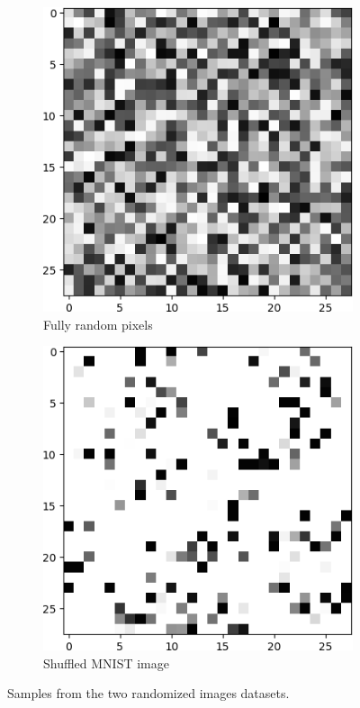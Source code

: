 \documentclass[12pt,oneside]{CUNY_PhD}
\begin{document}
\begin{figure}[!h]
    \centering
    \begin{subfigure}[t]{0.49\textwidth}
        \includegraphics[width=\textwidth]{images/mnist-behavior/MNIST-Sample-random-noise-fixed.png}
        \caption*{Fully random pixels}
    \end{subfigure}
    \begin{subfigure}[t]{0.49\textwidth}
        \includegraphics[width=\textwidth]{images/mnist-behavior/MNIST-Sample-random-shuffled-noise-fixed.png}
        \caption*{Shuffled MNIST image}
    \end{subfigure}
    \caption{Samples from the two randomized images datasets.}
    \label{fig:randoms}
\end{figure}
\end{document}
